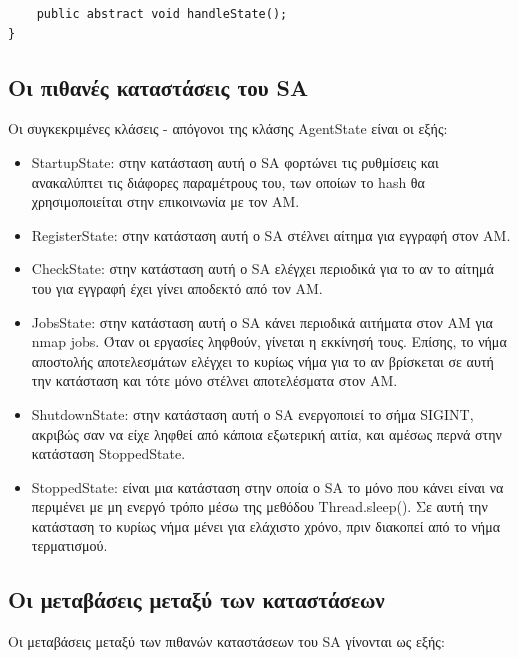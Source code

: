 \documentclass[a4paper,11pt]{article}
\begin{document}
\begin{sloppypar}
\begin{lstlisting}
    public abstract void handleState();
}
\end{lstlisting}

\newpage

\subsection{Οι πιθανές καταστάσεις του SA}
Οι συγκεκριμένες κλάσεις - απόγονοι της κλάσης AgentState είναι οι εξής:

\begin{itemize}

\item StartupState: στην κατάσταση αυτή ο SA φορτώνει τις ρυθμίσεις και ανακαλύπτει τις διάφορες παραμέτρους του, των οποίων το hash θα χρησιμοποιείται στην επικοινωνία με τον AM.

\item RegisterState: στην κατάσταση αυτή ο SA στέλνει αίτημα για εγγραφή στον AM.

\item CheckState: στην κατάσταση αυτή ο SA ελέγχει περιοδικά για το αν το αίτημά του για εγγραφή έχει γίνει αποδεκτό από τον AM.

\item JobsState: στην κατάσταση αυτή ο SA κάνει περιοδικά αιτήματα στον AM για nmap jobs. Όταν οι εργασίες ληφθούν, γίνεται η εκκίνησή τους. Επίσης, το νήμα αποστολής αποτελεσμάτων ελέγχει το κυρίως νήμα για το αν βρίσκεται σε αυτή την κατάσταση και τότε μόνο στέλνει αποτελέσματα στον AM.

\item ShutdownState: στην κατάσταση αυτή ο SA ενεργοποιεί το σήμα SIGINT, ακριβώς σαν να είχε ληφθεί από κάποια εξωτερική αιτία, και αμέσως περνά στην κατάσταση StoppedState.

\item StoppedState: είναι μια κατάσταση στην οποία ο SA το μόνο που κάνει είναι να περιμένει με μη ενεργό τρόπο μέσω της μεθόδου Thread.sleep(). Σε αυτή την κατάσταση το κυρίως νήμα μένει για ελάχιστο χρόνο, πριν διακοπεί από το νήμα τερματισμού.

\end{itemize}

\subsection{Οι μεταβάσεις μεταξύ των καταστάσεων}

Οι μεταβάσεις μεταξύ των πιθανών καταστάσεων του SA γίνονται ως εξής:


\end{sloppypar}
\end{document}
